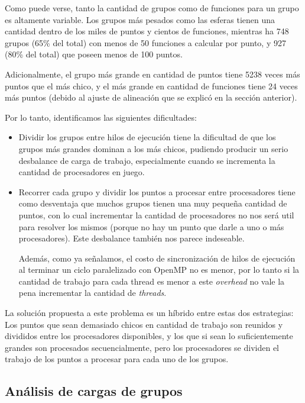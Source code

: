 Como puede verse, tanto la cantidad de grupos como de funciones para un grupo es altamente
variable. Los grupos m\'as pesados como las esferas tienen una cantidad dentro de los
miles de puntos y cientos de funciones, mientras ha 748 grupos (65\%
del total) con menos de 50 funciones a calcular por punto, y 927 (80\% del total)
que poseen menos de 100 puntos.

Adicionalmente, el grupo m\'as grande en cantidad de puntos tiene 5238 veces m\'as
puntos que el m\'as chico, y el m\'as grande en cantidad de funciones tiene 24
veces m\'as puntos (debido al ajuste de alineaci\'on que se explic\'o en la 
secci\'on anterior).

Por lo tanto, identificamos las siguientes dificultades:

\begin{itemize}
    \item Dividir los grupos entre hilos de ejecuci\'on tiene la dificultad de que
    los grupos m\'as grandes dominan a los m\'as chicos, pudiendo producir un serio
    desbalance de carga de trabajo, especialmente cuando se incrementa la cantidad de
    procesadores en juego.
    \item Recorrer cada grupo y dividir los puntos a procesar entre procesadores
    tiene como desventaja que muchos grupos tienen una muy peque\~na cantidad de
    puntos, con lo cual incrementar la cantidad de procesadores no nos ser\'a util
    para resolver los mismos (porque no hay un punto que darle a uno o m\'as procesadores).
    Este desbalance tambi\'en nos parece indeseable. 
    
    Adem\'as, como ya se\~nalamos, el costo de sincronizaci\'on de hilos de 
    ejecuci\'on al terminar un ciclo paralelizado con OpenMP no es menor, por
    lo tanto si la cantidad de trabajo para cada thread es menor a este 
    \textit{overhead} no vale la pena incrementar la cantidad de \textit{threads}.
\end{itemize}

La soluci\'on propuesta a este problema es un h\'ibrido entre estas dos
estrategias: Los puntos que sean demasiado chicos en cantidad de trabajo son
reunidos y divididos entre los procesadores disponibles, y los que si sean lo
suficientemente grandes son procesados secuencialmente, pero los procesadores se
dividen el trabajo de los puntos a procesar para cada uno de los grupos.

\subsection{An\'alisis de cargas de grupos}

